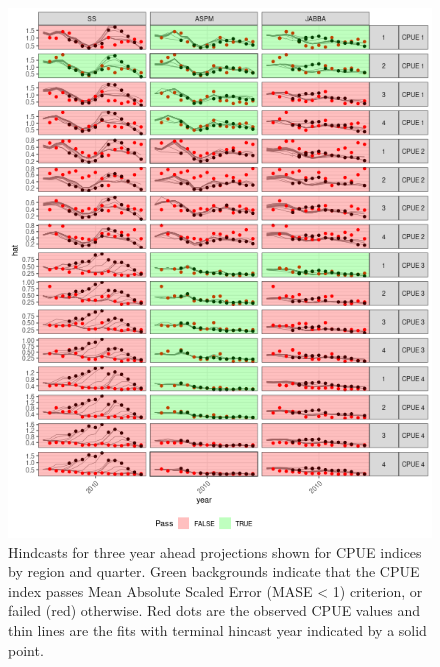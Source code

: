 \documentclass[12pt,halfline,a4paper,nonumbib]{ouparticle}
\begin{document}
\begin{figure}[htbp]
\centering
\includegraphics[width=6in]{figures/final-hy3-plot-1.png}
\caption{Hindcasts for three year ahead projections shown for CPUE indices by region and quarter. Green backgrounds indicate that the CPUE index passes Mean Absolute Scaled Error (MASE < 1) criterion, or failed (red) otherwise. Red dots are the observed CPUE values and thin lines are the fits with terminal hincast year indicated by a solid point.}
\label{fig:hy3}
\end{figure}
\end{document}

